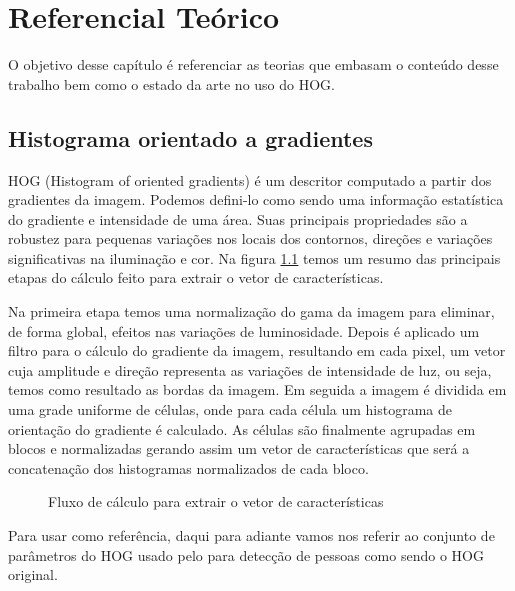 \chapter{Referencial Teórico}

O objetivo desse capítulo é referenciar as teorias que embasam o conteúdo desse trabalho bem como o estado da arte no uso do HOG.

\section{Histograma orientado a gradientes}
\label{sec:HOG}

HOG (Histogram of oriented gradients) é um descritor computado a partir dos gradientes da imagem. Podemos defini-lo como sendo uma informação estatística do gradiente e intensidade de uma área. Suas principais propriedades são a robustez para pequenas variações nos locais dos contornos, direções e variações significativas na iluminação e cor. Na figura \ref{fig:hog} temos um resumo das principais etapas do cálculo feito para extrair o vetor de características.

Na primeira etapa temos uma normalização do gama da imagem para eliminar, de forma global, efeitos nas variações de luminosidade. Depois é aplicado um filtro para o cálculo do gradiente da imagem, resultando em cada pixel, um vetor cuja amplitude e direção representa as variações de intensidade de luz, ou seja, temos como resultado as bordas da imagem. Em seguida a imagem é dividida em uma grade uniforme de células, onde para cada célula um histograma de orientação do gradiente é calculado. As células são finalmente agrupadas em blocos e normalizadas gerando assim um vetor de características que será a concatenação dos histogramas normalizados de cada bloco.

\begin{figure}[ht!]
\centering
{}
  \caption{Fluxo de cálculo para extrair o vetor de características}
  \label{fig:hog}
\end{figure}

Para usar como referência, daqui para adiante vamos nos referir ao conjunto de parâmetros do HOG usado pelo  para detecção de pessoas como sendo o HOG original.

